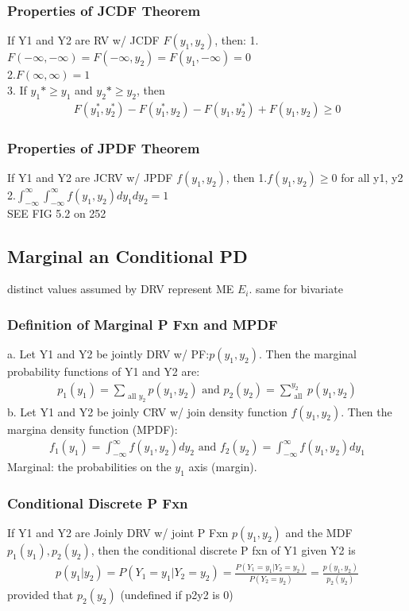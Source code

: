 \documentclass[12pt]{article}
\begin{document}
    \subsubsection{Properties of JCDF Theorem}
        If Y1 and Y2 are RV w/ JCDF $ F(y_{1}, y_{2}) $, then:
        1.$ F(-\infty ,-\infty ) = F(-\infty , y_2) = F(y_{1}, -\infty )= 0$\\
        2.$ F(\infty , \infty )= 1 $\\
        3. If $ y_{1}* \ge y_{1} $ and $ y_{2}* \ge y_2 $, then
        \begin{align*}
            F(y_{1}^*, y_2^*)-F(y_{1}^*, y_2)-F(y_1, y_2^*) + F(y_1, y_2) \ge 0
        \end{align*}
    \subsubsection{Properties of JPDF Theorem}
        If Y1 and Y2 are JCRV w/ JPDF $ f(y_1, y_2) $, then
        1.$ f(y_1, y_2) \ge 0$ for all y1, y2\\
        2.$ \int_{-\infty }^{\infty }\int_{-\infty }^{\infty }
        f(y_1, y_2)dy_1dy_2 = 1 $ \\
        SEE FIG 5.2 on 252
\subsection{Marginal an Conditional PD}
	distinct values assumed by DRV represent ME $ E_i $. same for bivariate
	\subsubsection{Definition of Marginal P Fxn and MPDF}
		a. Let Y1 and Y2 be jointly DRV w/ PF:$ p(y_1, y_2) $. Then the
		marginal probability functions of Y1 and Y2 are:
		\begin{align*}
			p_1(y_1) = \sum_{\text{ all } y_2}p(y_1, y_2) \text{ and }
			p_2(y_2) = \sum_{\text{ all }}^{ y_2 }p(y_1, y_2)
		\end{align*}
		b. Let Y1 and Y2 be joinly CRV w/ join density function $ f(y_1, y_2) $.
		Then the margina density function (MPDF):
		\begin{align*}
			f_1(y_1) = \int_{-\infty }^{\infty }f(y_1, y_2)dy_2 \text{ and }
			f_2(y_2) = \int_{-\infty }^{\infty }f(y_1, y_2)dy_1
		\end{align*}
		Marginal: the probabilities on the $ y_1 $ axis (margin).
	\subsubsection{Conditional Discrete P Fxn}
		If Y1 and Y2 are Joinly DRV w/ joint P Fxn $ p(y_1, y_2) $
		and the MDF $ p_1(y_1), p_2(y_2) $, then the conditional discrete
		P fxn of Y1 given Y2 is
		\begin{align*}
			p(y_1| y_2) = P(Y_1 = y_1 | Y_2 = y_2) = 
			\frac{P(Y_1 = y_1 | Y_2 = y_2)}{P(Y_2 = y_2)} = 
			\frac{p(y_1, y_2)}{p_2(y_2)} 
		\end{align*}
		provided that $ p_2(y_2) $ (undefined if p2y2 is 0)
\end{document}
